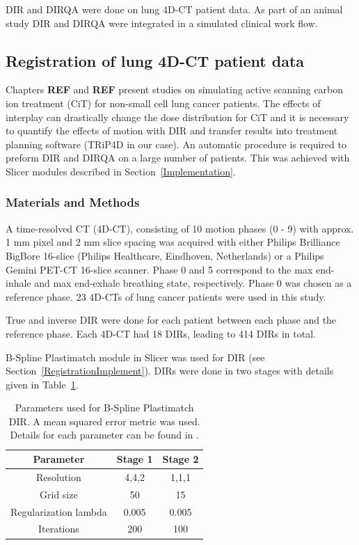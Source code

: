 DIR and DIRQA were done on lung 4D-CT patient data. As part of an animal study \cite{Lehmann2015} DIR and DIRQA were integrated in a simulated clinical work flow. 

\subsection{Registration of lung 4D-CT patient data}
\label{lungDIR}

Chapters \textbf{REF} and \textbf{REF} present studies on simulating active scanning carbon ion treatment (CiT) for non-small cell lung cancer patients. The effects of interplay can drastically change the dose distribution for CiT and it is necessary to quantify the effects of motion with DIR and transfer results into treatment planning software (TRiP4D in our case). An automatic procedure is required to preform DIR and DIRQA on a large number of patients. This was achieved with Slicer modules described in Section~\ref{Implementation}.

\subsubsection{Materials and Methods}

A time-resolved CT (4D-CT), consisting of 10 motion phases (0 - 9) with approx. 1 mm pixel and 2 mm slice spacing was acquired with either Philips Brilliance BigBore 16-slice 
(Philips Healthcare, Eindhoven, Netherlands) or a Philips Gemini PET-CT 16-slice scanner. 
Phase 0 and 5 correspond to the max end-inhale and max end-exhale breathing state, respectively. Phase 0 was chosen as a reference phase. 23 4D-CTs of lung cancer patients were used in this study.

True and inverse DIR were done for each patient between each phase and the reference phase. Each 4D-CT had 18 DIRs, leading to 414 DIRs in total.

B-Spline Plastimatch module in Slicer was used for DIR (see Section~\ref{RegistrationImplement}). DIRs were done in two stages with details given in Table~\ref{tab:stages}. 

\begin{table}[H]
  \centering
  \caption{Parameters used for B-Spline Plastimatch DIR. A mean squared error metric was used. Details for each parameter can be found in \cite{Plastimatch}.}
  \begin{tabular}{c|c|c}
      Parameter & Stage 1 & Stage 2 \\
      \hline
      Resolution & 4,4,2 & 1,1,1 \\
      Grid size & 50 & 15 \\
      Regularization lambda & 0.005 & 0.005 \\
      Iterations & 200 & 100 \\
    \hline\hline
  \end{tabular}
  \label{tab:stages}
\end{table}

